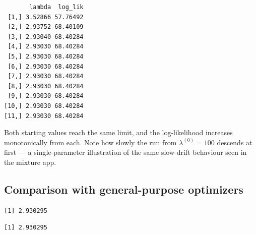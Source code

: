 \documentclass[
  letterpaper,
  DIV=11,
  numbers=noendperiod]{scrreprt}
\newenvironment{Shaded}{\begin{snugshade}}{\end{snugshade}}
\newcommand{\AttributeTok}[1]{\textcolor[rgb]{0.40,0.45,0.13}{#1}}
\newcommand{\ControlFlowTok}[1]{\textcolor[rgb]{0.00,0.23,0.31}{\textbf{#1}}}
\newcommand{\DecValTok}[1]{\textcolor[rgb]{0.68,0.00,0.00}{#1}}
\newcommand{\FunctionTok}[1]{\textcolor[rgb]{0.28,0.35,0.67}{#1}}
\newcommand{\NormalTok}[1]{\textcolor[rgb]{0.00,0.23,0.31}{#1}}
\newcommand{\OtherTok}[1]{\textcolor[rgb]{0.00,0.23,0.31}{#1}}
\newcommand{\SpecialCharTok}[1]{\textcolor[rgb]{0.37,0.37,0.37}{#1}}
\begin{document}
\begin{verbatim}
       lambda  log_lik
 [1,] 3.52866 57.76492
 [2,] 2.93752 68.40109
 [3,] 2.93040 68.40284
 [4,] 2.93030 68.40284
 [5,] 2.93030 68.40284
 [6,] 2.93030 68.40284
 [7,] 2.93030 68.40284
 [8,] 2.93030 68.40284
 [9,] 2.93030 68.40284
[10,] 2.93030 68.40284
[11,] 2.93030 68.40284
\end{verbatim}

Both starting values reach the same limit, and the log-likelihood
increases monotonically from each. Note how slowly the run from
\(\lambda^{(0)} = 100\) descends at first --- a single-parameter
illustration of the same slow-drift behaviour seen in the mixture app.

\subsection{Comparison with general-purpose
optimizers}\label{comparison-with-general-purpose-optimizers-1}

\begin{Shaded}
\end{Shaded}

\begin{verbatim}
[1] 2.930295
\end{verbatim}

\begin{Shaded}
\end{Shaded}

\begin{verbatim}
[1] 2.930295
\end{verbatim}
\end{document}
